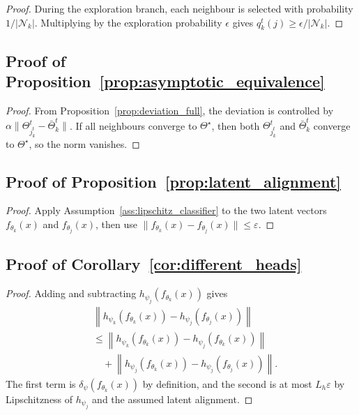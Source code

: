 \documentclass[conference]{IEEEtran}
\begin{document}
\begin{proof}
During the exploration branch, each neighbour is selected with probability \(1/|\mathcal{N}_k|\). Multiplying by the exploration probability \(\epsilon\) gives \(q_k^t(j)\geq\epsilon/|\mathcal{N}_k|\).
\end{proof}

\subsection{Proof of Proposition~\ref{prop:asymptotic_equivalence}}
\begin{proof}
From Proposition~\ref{prop:deviation_full}, the deviation is controlled by \(\alpha\|\Theta_{j_k^t}^t-\bar{\Theta}_k^t\|\). If all neighbours converge to \(\Theta^\star\), then both \(\Theta_{j_k^t}^t\) and \(\bar{\Theta}_k^t\) converge to \(\Theta^\star\), so the norm vanishes.
\end{proof}

\subsection{Proof of Proposition~\ref{prop:latent_alignment}}
\begin{proof}
Apply Assumption~\ref{ass:lipschitz_classifier} to the two latent vectors \(f_{\theta_k}(x)\) and \(f_{\theta_j}(x)\), then use \(\|f_{\theta_k}(x)-f_{\theta_j}(x)\|\leq\varepsilon\).
\end{proof}

\subsection{Proof of Corollary~\ref{cor:different_heads}}
\begin{proof}
Adding and subtracting \(h_{\psi_j}(f_{\theta_k}(x))\) gives
\begin{align*}
&\left\|
 h_{\psi_k}(f_{\theta_k}(x))
 -h_{\psi_j}(f_{\theta_j}(x))
\right\| \\
&\leq
\left\|
 h_{\psi_k}(f_{\theta_k}(x))
 -h_{\psi_j}(f_{\theta_k}(x))
\right\| \\
&\quad+
\left\|
 h_{\psi_j}(f_{\theta_k}(x))
 -h_{\psi_j}(f_{\theta_j}(x))
\right\|.
\end{align*}
The first term is \(\delta_{\psi}(f_{\theta_k}(x))\) by definition, and the second is at most \(L_h\varepsilon\) by Lipschitzness of \(h_{\psi_j}\) and the assumed latent alignment.
\end{proof}
\end{document}
